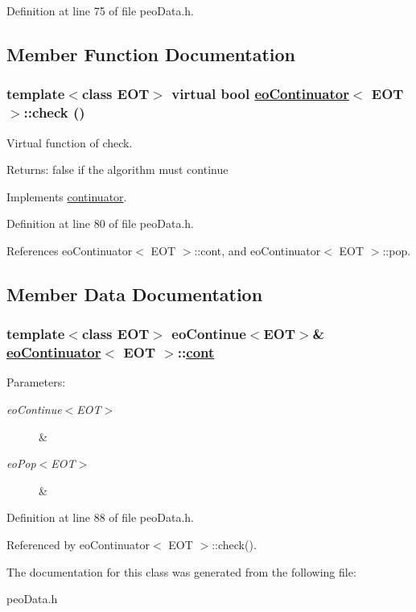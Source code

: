 Definition at line 75 of file peo\-Data.h.

\subsection{Member Function Documentation}
\hypertarget{classeoContinuator_4e599bd4db85a57b44f9b94580eee178}{
\subsubsection[check]{\setlength{\rightskip}{0pt plus 5cm}template$<$class EOT$>$ virtual bool \hyperlink{classeoContinuator}{eo\-Continuator}$<$ EOT $>$::check ()}}
\label{classeoContinuator_4e599bd4db85a57b44f9b94580eee178}


Virtual function of check. 

\begin{Desc}
\item[Returns:]false if the algorithm must continue \end{Desc}


Implements \hyperlink{classcontinuator_30601b037ab27b40610af1b979ec3d5b}{continuator}.

Definition at line 80 of file peo\-Data.h.

References eo\-Continuator$<$ EOT $>$::cont, and eo\-Continuator$<$ EOT $>$::pop.

\subsection{Member Data Documentation}
\hypertarget{classeoContinuator_1c388d11915be8883f98a2511d598537}{
\subsubsection[cont]{\setlength{\rightskip}{0pt plus 5cm}template$<$class EOT$>$ \bf{eo\-Continue}$<$EOT$>$\& \hyperlink{classeoContinuator}{eo\-Continuator}$<$ EOT $>$::\hyperlink{classeoContinuator_1c388d11915be8883f98a2511d598537}{cont}}}
\label{classeoContinuator_1c388d11915be8883f98a2511d598537}


\begin{Desc}
\item[Parameters:]
\begin{description}
\item[{\em eo\-Continue$<$EOT$>$}]\& \item[{\em eo\-Pop$<$EOT$>$}]\& \end{description}
\end{Desc}


Definition at line 88 of file peo\-Data.h.

Referenced by eo\-Continuator$<$ EOT $>$::check().

The documentation for this class was generated from the following file:\begin{CompactItemize}
\item 
peo\-Data.h\end{CompactItemize}
